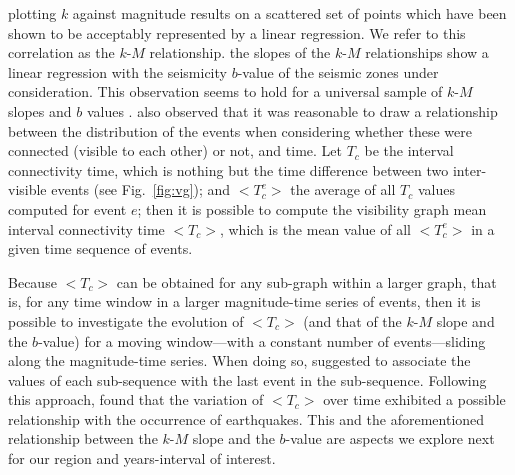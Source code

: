  plotting $k$ against magnitude results on a scattered set of points which have been shown to be acceptably represented by a linear regression. We refer to this correlation as the $k$-$M$ relationship.  the slopes of the $k$-$M$ relationships show a linear regression with the seismicity $b$-value of the seismic zones under consideration. {This observation seems to hold} for a universal sample of $k$-$M$ slopes and $b$ values  \citet{Telesca2013, Telesca2014}. \citet{Telesca2014} also observed that it was reasonable to draw a relationship between the distribution of the events when considering whether these were connected (visible to each other) or not, and time. Let $T_c$ be the interval connectivity time, which is nothing but the time difference between two inter-visible events (see Fig.~\ref{fig:vg}); and $<$$T_c^e$$>$ the average of all $T_c$ values computed for event $e$; then it is possible to compute the visibility graph mean interval connectivity time $<$$T_c$$>$, which is the mean value of all $<$$T_c^e$$>$ in a given time sequence of events.

Because $<$$T_c$$>$ can be obtained for any sub-graph within a larger graph, that is, for any time window in a larger magnitude-time series of events, then it is possible to investigate the evolution of $<$$T_c$$>$ (and that of the $k$-$M$ slope and the $b$-value) for a moving window---with a constant number of events---sliding along the magnitude-time series. When doing so, \citet{Telesca2016} suggested to associate the values of each sub-sequence with the last event in the sub-sequence. Following this approach, \citet{Telesca2016} found that the variation of $<$$T_c$$>$ over time exhibited a possible relationship with the occurrence of earthquakes. This and the aforementioned relationship between the $k$-$M$ slope and the $b$-value are aspects we explore next for our region and years-interval of interest.



